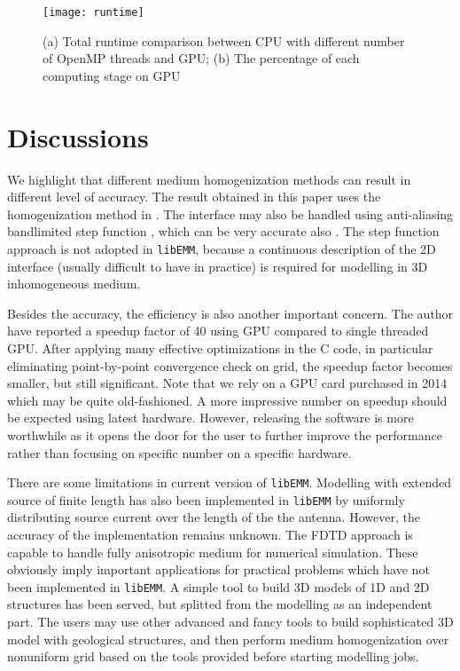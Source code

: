\documentclass[a4paper,10pt]{article}
\begin{document}
\begin{figure}[!htb]
  \centering
  \texttt{[image: runtime]}
  \caption{(a) Total runtime comparison between CPU with different number of OpenMP threads and GPU; (b) The percentage of each computing stage on GPU}\label{fig:runtime}
\end{figure}


\section{Discussions}

We highlight that different medium homogenization methods can result in different level of accuracy. The result obtained in this paper uses the homogenization method in \citep{davydycheva2003efficient}. The interface may also be handled using anti-aliasing bandlimited step function \citep{mittet2021small}, which can be very accurate also \citep{Yang_2023_HFDNU}. The step function approach is not adopted in \verb|libEMM|, because a continuous description of the 2D interface (usually difficult to have in practice) is required for modelling in 3D inhomogeneous medium.

Besides the accuracy, the efficiency is also another important concern. The author have reported a speedup factor of 40 \citep{Yang_2021_GPU_CSEM} using GPU compared to single threaded GPU. After applying many effective optimizations in the C code, in particular eliminating point-by-point convergence check on grid, the speedup factor becomes smaller, but still significant. Note that we rely on a GPU card purchased in 2014 which may be quite old-fashioned. A more impressive number on speedup should be expected using latest hardware. However, releasing the software is more worthwhile as it opens the door for the user to further improve the performance rather than focusing on specific number on a specific hardware.

There are some limitations in current version of \verb|libEMM|.
Modelling with extended source of finite length has also been implemented in \verb|libEMM| by uniformly distributing source current over the length of the the antenna. However, the accuracy of the implementation remains unknown. The FDTD approach is capable to handle fully anisotropic medium for numerical simulation. These obviously imply important applications for practical problems which have not been implemented in \verb|libEMM|. A simple tool to build 3D models of 1D and 2D structures has been served, but splitted from the modelling as an independent part. The users may use other advanced and fancy tools to build sophisticated 3D model with geological structures, and then perform medium homogenization over nonuniform grid based on the tools provided before starting modelling jobs.
\end{document}

